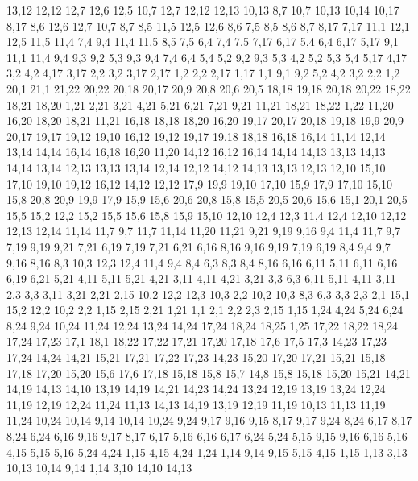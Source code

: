 13,12
12,12
12,7
12,6
12,5
%
10,7
12,7
12,12
12,13
10,13
%
8,7
10,7
10,13
10,14
10,17
8,17
%
8,6
12,6
12,7
10,7
8,7
%
8,5
11,5
12,5
12,6
8,6
%
7,5
8,5
8,6
8,7
8,17
7,17
%
11,1
12,1
12,5
11,5
11,4
%
7,4
9,4
11,4
11,5
8,5
7,5
%
6,4
7,4
7,5
7,17
6,17
%
5,4
6,4
6,17
5,17
%
9,1
11,1
11,4
9,4
9,3
9,2
%
5,3
9,3
9,4
7,4
6,4
5,4
%
5,2
9,2
9,3
5,3
%
4,2
5,2
5,3
5,4
5,17
4,17
%
3,2
4,2
4,17
3,17
%
2,2
3,2
3,17
2,17
%
1,2
2,2
2,17
1,17
%
1,1
9,1
9,2
5,2
4,2
3,2
2,2
1,2
20,1
21,1
21,22
20,22
20,18
20,17
20,9
20,8
20,6
20,5
%
18,18
19,18
20,18
20,22
18,22
18,21
18,20
%
1,21
2,21
3,21
4,21
5,21
6,21
7,21
9,21
11,21
18,21
18,22
1,22
%
11,20
16,20
18,20
18,21
11,21
%
16,18
18,18
18,20
16,20
%
19,17
20,17
20,18
19,18
%
19,9
20,9
20,17
19,17
19,12
19,10
%
16,12
19,12
19,17
19,18
18,18
16,18
16,14
%
11,14
12,14
13,14
14,14
16,14
16,18
16,20
11,20
%
14,12
16,12
16,14
14,14
14,13
%
13,13
14,13
14,14
13,14
%
12,13
13,13
13,14
12,14
%
12,12
14,12
14,13
13,13
12,13
%
12,10
15,10
17,10
19,10
19,12
16,12
14,12
12,12
%
17,9
19,9
19,10
17,10
%
15,9
17,9
17,10
15,10
%
15,8
20,8
20,9
19,9
17,9
15,9
%
15,6
20,6
20,8
15,8
%
15,5
20,5
20,6
15,6
%
15,1
20,1
20,5
15,5
15,2
%
12,2
15,2
15,5
15,6
15,8
15,9
15,10
12,10
12,4
12,3
%
11,4
12,4
12,10
12,12
12,13
12,14
11,14
11,7
%
9,7
11,7
11,14
11,20
11,21
9,21
9,19
9,16
%
9,4
11,4
11,7
9,7
%
7,19
9,19
9,21
7,21
%
6,19
7,19
7,21
6,21
%
6,16
8,16
9,16
9,19
7,19
6,19
%
8,4
9,4
9,7
9,16
8,16
%
8,3
10,3
12,3
12,4
11,4
9,4
8,4
%
6,3
8,3
8,4
8,16
6,16
6,11
%
5,11
6,11
6,16
6,19
6,21
5,21
%
4,11
5,11
5,21
4,21
%
3,11
4,11
4,21
3,21
%
3,3
6,3
6,11
5,11
4,11
3,11
%
2,3
3,3
3,11
3,21
2,21
2,15
%
10,2
12,2
12,3
10,3
%
2,2
10,2
10,3
8,3
6,3
3,3
2,3
%
2,1
15,1
15,2
12,2
10,2
2,2
%
1,15
2,15
2,21
1,21
%
1,1
2,1
2,2
2,3
2,15
1,15
1,24
4,24
5,24
6,24
8,24
9,24
10,24
11,24
12,24
13,24
14,24
17,24
18,24
18,25
1,25
%
17,22
18,22
18,24
17,24
17,23
%
17,1
18,1
18,22
17,22
17,21
17,20
17,18
17,6
17,5
17,3
%
14,23
17,23
17,24
14,24
%
14,21
15,21
17,21
17,22
17,23
14,23
%
15,20
17,20
17,21
15,21
%
15,18
17,18
17,20
15,20
%
15,6
17,6
17,18
15,18
15,8
15,7
%
14,8
15,8
15,18
15,20
15,21
14,21
14,19
14,13
14,10
%
13,19
14,19
14,21
14,23
14,24
13,24
%
12,19
13,19
13,24
12,24
%
11,19
12,19
12,24
11,24
%
11,13
14,13
14,19
13,19
12,19
11,19
%
10,13
11,13
11,19
11,24
10,24
10,14
%
9,14
10,14
10,24
9,24
9,17
9,16
9,15
%
8,17
9,17
9,24
8,24
%
6,17
8,17
8,24
6,24
%
6,16
9,16
9,17
8,17
6,17
%
5,16
6,16
6,17
6,24
5,24
%
5,15
9,15
9,16
6,16
5,16
%
4,15
5,15
5,16
5,24
4,24
%
1,15
4,15
4,24
1,24
%
1,14
9,14
9,15
5,15
4,15
1,15
%
1,13
3,13
10,13
10,14
9,14
1,14
%
3,10
14,10
14,13
